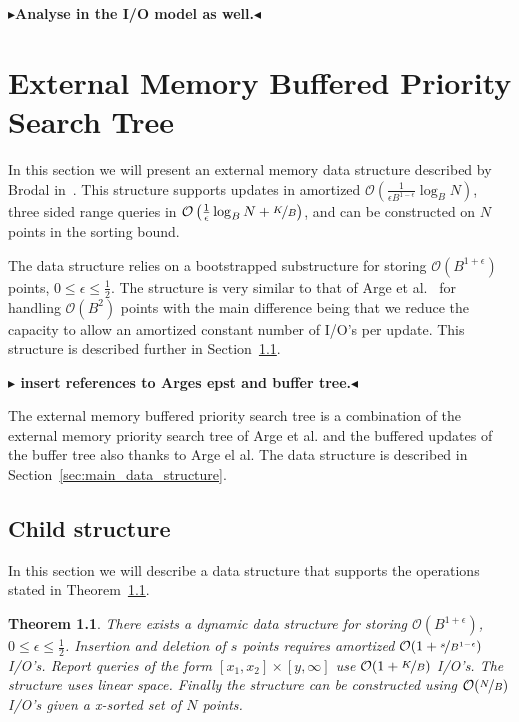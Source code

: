 \documentclass[twoside,11pt,openright]{report}
\newtheorem{theorem}{Theorem}
\newcommand{\todo}[1]{{\color[rgb]{.5,0,0}\textbf{$\blacktriangleright$#1$\blacktriangleleft$}}}
\begin{document}
\todo{Analyse in the I/O model as well.}

\chapter{External Memory Buffered Priority Search Tree}
\label{chp:epst}
In this section we will present an external memory data structure described by Brodal in~\cite{DBLP:journals/corr/Brodal15}. This structure supports updates in amortized $\mathcal{O}\left(\frac{1}{\epsilon B^{1-\epsilon}} \log_B N\right)$, three sided range queries in $\mathcal{O}\left(\frac{1}{\epsilon}\log_B N + \nicefrac{K}{B}\right)$, and can be constructed on $N$ points in the sorting bound.

The data structure relies on a bootstrapped substructure for storing $\mathcal{O}(B^{1+\epsilon})$ points, $0 \leq \epsilon \leq \frac{1}{2}$.
The structure is very similar to that of Arge et al.~\cite[Section~3.1]{arge_vitter_2003} for handling $\mathcal{O}(B^2)$ points with the main difference being that we reduce the capacity to allow an amortized constant number of I/O's per update. This structure is described further in Section~\ref{sec:child_structure}.

\todo{ insert references to Arges epst and buffer tree.}

The external memory buffered priority search tree is a combination of the external memory priority search tree of Arge et al. and the buffered updates of the buffer tree also thanks to Arge el al. The data structure is described in Section~\ref{sec:main_data_structure}.

\section{Child structure} %
\label{sec:child_structure}
In this section we will describe a data structure that supports the operations stated in Theorem~\ref{thm:child_structure}.
\begin{theorem}
\label{thm:child_structure}
There exists a dynamic data structure for storing $\mathcal{O}(B^{1+\epsilon})$, $0 \leq \epsilon \leq \frac{1}{2}$.
Insertion and deletion of $s$ points requires amortized $\mathcal{O}(1+\nicefrac{s}{B^{1-\epsilon}})$ I/O's.
Report queries of the form $[x_1,x_2] \times [y,\infty]$ use $\mathcal{O}(1+\nicefrac{K}{B})$ I/O's.
The structure uses linear space.
Finally the structure can be constructed using $\mathcal{O}(\nicefrac{N}{B})$ I/O's given a x-sorted set of $N$ points.
\end{theorem}
\end{document}
